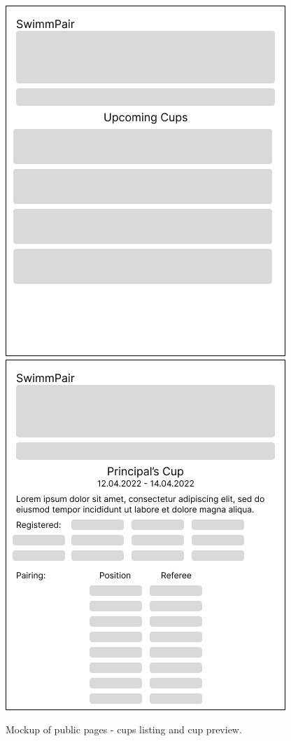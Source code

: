 \begin{figure}[h]	
	\centering	
    \includegraphics[scale=0.457]{img/def-U-ListingCups.png}
    \includegraphics[scale=0.457]{img/def-U-Cup.png}
	\caption{Mockup of public pages - cups listing and cup preview.}
	\label{fig1.3:fepublicpages2}
\end{figure}
\newpage
